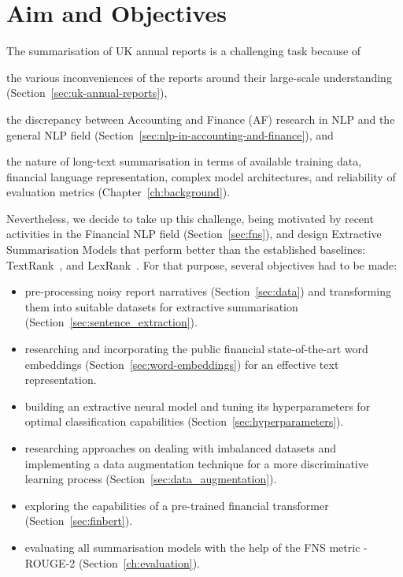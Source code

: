 \section{Aim and Objectives}\label{sec:aim-and-objectives}
The summarisation of UK annual reports is a challenging task because of
 \begin{enumerate*}
     \item the various inconveniences of the reports around their large-scale understanding (Section~\ref{sec:uk-annual-reports}),
     \item the discrepancy between Accounting and Finance (AF) research in NLP and the general NLP field (Section~\ref{sec:nlp-in-accounting-and-finance}), and
     \item the nature of long-text summarisation in terms of available training data, financial language representation, complex model architectures, and reliability of evaluation metrics (Chapter~\ref{ch:background}).
 \end{enumerate*}
 Nevertheless, we decide to take up this challenge, being motivated by recent activities in the Financial NLP field
(Section~\ref{sec:fns}), and design Extractive Summarisation Models that perform better than the established baselines: TextRank~\cite{mihalcea-tarau-2004-textrank}, and LexRank~\cite{Erkan2004LexRankGC}.
 For that purpose, several objectives had to be made:
 \begin{itemize}
     \item pre-processing noisy report narratives (Section~\ref{sec:data}) and transforming them into suitable datasets for extractive summarisation (Section~\ref{sec:sentence_extraction}).
     \item researching and incorporating the public financial state-of-the-art word embeddings (Section~\ref{sec:word-embeddings}) for an effective text representation.
     \item building an extractive neural model and tuning its hyperparameters for optimal classification capabilities (Section~\ref{sec:hyperparameters}).
     \item researching approaches on dealing with imbalanced datasets and implementing a data augmentation technique for a more discriminative learning process (Section~\ref{sec:data_augmentation}).
     \item exploring the capabilities of a pre-trained financial transformer (Section~\ref{sec:finbert}).
     \item evaluating all summarisation models with the help of the FNS metric - ROUGE-2 (Section~\ref{ch:evaluation}).
 \end{itemize}